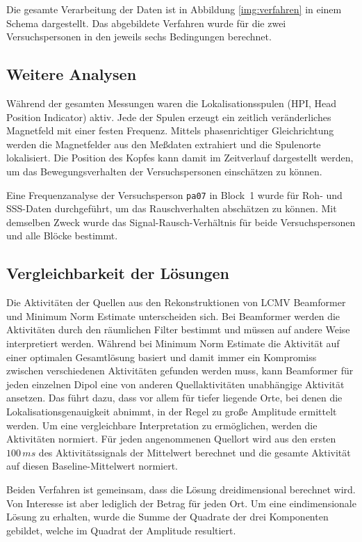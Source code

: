 \documentclass[doc,a4paper,12pt]{apa6}
\begin{document}
Die gesamte Verarbeitung der Daten ist in Abbildung \ref{img:verfahren} in einem Schema dargestellt. Das abgebildete Verfahren wurde für die zwei Versuchspersonen in den jeweils sechs Bedingungen berechnet.

\subsection{Weitere Analysen}

Während der gesamten Messungen waren die Lokalisationsspulen (HPI, Head Position Indicator) aktiv. Jede der Spulen erzeugt ein zeitlich veränderliches Magnetfeld mit einer festen Frequenz. Mittels phasenrichtiger Gleichrichtung werden die Magnetfelder aus den Meßdaten extrahiert und die Spulenorte lokalisiert. Die Position des Kopfes kann damit im Zeitverlauf dargestellt werden, um das Bewegungsverhalten der Versuchspersonen einschätzen zu können.

Eine Frequenzanalyse der Versuchsperson \texttt{pa07} in Block~1 wurde für Roh- und SSS-Daten durchgeführt, um das Rauschverhalten abschätzen zu können. Mit demselben Zweck wurde das Signal-Rausch-Verhältnis für beide Versuchspersonen und alle Blöcke bestimmt.

\subsection{Vergleichbarkeit der Lösungen}
\label{sec:amplitud}

Die Aktivitäten der Quellen aus den Rekonstruktionen von LCMV Beamformer und Minimum Norm Estimate unterscheiden sich. Bei Beamformer werden die Aktivitäten durch den räumlichen Filter bestimmt und müssen auf andere Weise interpretiert werden. Während bei Minimum Norm Estimate die Aktivität auf einer optimalen Gesamtlösung basiert und damit immer ein Kompromiss zwischen verschiedenen Aktivitäten gefunden werden muss, kann Beamformer für jeden einzelnen Dipol eine von anderen Quellaktivitäten unabhängige Aktivität ansetzen. Das führt dazu, dass vor allem für tiefer liegende Orte, bei denen die Lokalisationsgenauigkeit abnimmt, in der Regel zu große Amplitude ermittelt werden. Um eine vergleichbare Interpretation zu ermöglichen, werden die Aktivitäten normiert. Für jeden angenommenen Quellort wird aus den ersten $100\,ms$ des Aktivitätssignals der Mittelwert berechnet und die gesamte Aktivität auf diesen Baseline-Mittelwert normiert.

Beiden Verfahren ist gemeinsam, dass die Lösung dreidimensional berechnet wird. Von Interesse ist aber lediglich der Betrag für jeden Ort. Um eine eindimensionale Lösung zu erhalten, wurde die Summe der Quadrate der drei Komponenten gebildet, welche im Quadrat der Amplitude resultiert.
\end{document}
